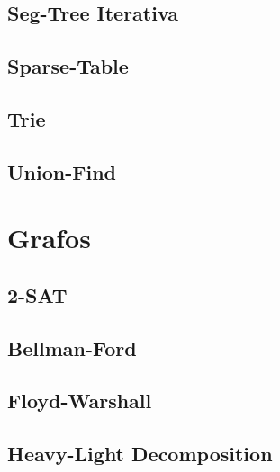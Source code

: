 \documentclass[12pt, a4paper, twoside]{article}
\begin{document}
\subsection{Seg-Tree Iterativa}


\subsection{Sparse-Table}


\subsection{Trie}


\subsection{Union-Find}




%
%

\section{Grafos}

\subsection{2-SAT}


\subsection{Bellman-Ford}


\subsection{Floyd-Warshall}


\subsection{Heavy-Light Decomposition}

\end{document}
